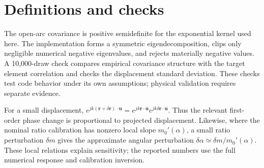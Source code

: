 \documentclass[11pt,a4paper]{report}
\begin{document}
\appendix
\chapter{Definitions and checks}
The open-arc covariance is positive semidefinite for the exponential kernel used here. The implementation forms a symmetric eigendecomposition, clips only negligible numerical negative eigenvalues, and rejects materially negative values. A 10,000-draw check compares empirical covariance structure with the target element correlation and checks the displacement standard deviation. These checks test code behavior under its own assumptions; physical validation requires separate evidence.

For a small displacement, $e^{jk(\mathbf r+\delta\mathbf r)\cdot\mathbf u}=e^{jk\mathbf r\cdot\mathbf u}e^{jk\delta\mathbf r\cdot\mathbf u}$. Thus the relevant first-order phase change is proportional to projected displacement. Likewise, where the nominal ratio calibration has nonzero local slope $m_0'(\alpha)$, a small ratio perturbation $\delta m$ gives the approximate angular perturbation $\delta\alpha\simeq\delta m/m_0'(\alpha)$. These local relations explain sensitivity; the reported numbers use the full numerical response and calibration inversion.
\end{document}
